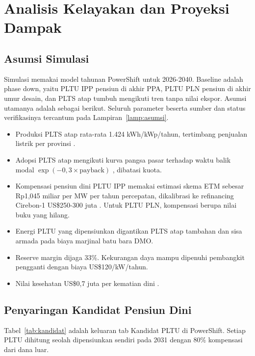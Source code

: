 \section{Analisis Kelayakan dan Proyeksi Dampak}
\label{sec:kelayakan}

\subsection{Asumsi Simulasi}

Simulasi memakai model tahunan PowerShift untuk 2026-2040. Baseline adalah phase down, yaitu PLTU IPP pensiun di akhir PPA, PLTU PLN pensiun di akhir umur desain, dan PLTS atap tumbuh mengikuti tren tanpa nilai ekspor. Asumsi utamanya adalah sebagai berikut. Seluruh parameter beserta sumber dan status verifikasinya tercantum pada Lampiran~\ref{lamp:asumsi}.
\begin{itemize}
  \item Produksi PLTS atap rata-rata 1.424 kWh/kWp/tahun, tertimbang penjualan listrik per provinsi \cite{D-GSA-PVOUT,D-PLN-STAT-2025}.
  \item Adopsi PLTS atap mengikuti kurva pangsa pasar terhadap waktu balik modal $\exp(-0{,}3 \times \text{payback})$ \cite{P-NREL-SOLARDS}, dibatasi kuota.
  \item Kompensasi pensiun dini PLTU IPP memakai estimasi skema ETM sebesar Rp1,045 miliar per MW per tahun percepatan, dikalibrasi ke refinancing Cirebon-1 US\$250-300 juta \cite{B-REUTERS-CIREBON-2022}. Untuk PLTU PLN, kompensasi berupa nilai buku yang hilang.
  \item Energi PLTU yang dipensiunkan digantikan PLTS atap tambahan dan sisa armada pada biaya marjinal batu bara DMO.
  \item Reserve margin dijaga 33\%. Kekurangan daya mampu dipenuhi pembangkit pengganti dengan biaya US\$120/kW/tahun.
  \item Nilai kesehatan US\$0,7 juta per kematian dini \cite{P-CREA-IESR-2023}.
\end{itemize}

\subsection{Penyaringan Kandidat Pensiun Dini}

Tabel~\ref{tab:kandidat} adalah keluaran tab Kandidat PLTU di PowerShift. Setiap PLTU dihitung seolah dipensiunkan sendiri pada 2031 dengan 80\% kompensasi dari dana luar.

\begin{table}[H]
\centering
\caption{Daftar urut kandidat pensiun dini 2031 menurut neraca negara per GW}
\label{tab:kandidat}
\resizebox{\textwidth}{!}{}
\end{table}


